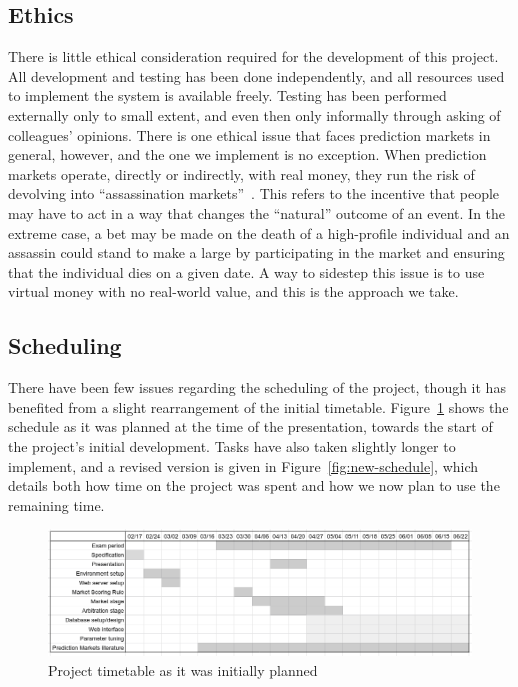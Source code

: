\documentclass[10pt,a4paper]{article}
\theoremstyle{plain}
\theoremstyle{definition}
\begin{document}
\subsection{Ethics}

There is little ethical consideration required for the development of this
project. All development and testing has been done independently, and all
resources used to implement the system is available freely. Testing has been
performed externally only to small extent, and even then only informally
through asking of colleagues' opinions. There is one ethical issue that faces
prediction markets in general, however, and the one we implement is no
exception. When prediction markets operate, directly or indirectly, with real
money, they run the risk of devolving into ``assassination
markets''~\cite{assassinationMarkets, crowdfundingMurder}. This refers to the
incentive that people may have to act in a way that changes the ``natural''
outcome of an event. In the extreme case, a bet may be made on the death of a
high-profile individual and an assassin could stand to make a large by
participating in the market and ensuring that the individual dies on a given
date. A way to sidestep this issue is to use virtual money with no real-world
value, and this is the approach we take.

\subsection{Scheduling}

There have been few issues regarding the scheduling of the project, though it
has benefited from a slight rearrangement of the initial timetable.
Figure~\ref{fig:old-schedule} shows the schedule as it was planned at the time
of the presentation, towards the start of the project's initial development.
Tasks have also taken slightly longer to implement, and a revised version is
given in Figure~\ref{fig:new-schedule}, which details both how time on the
project was spent and how we now plan to use the remaining time.

\begin{figure}[h]
	\centering
	\includegraphics[width=\textwidth]{old-schedule}
	\caption{Project timetable as it was initially planned}
	\label{fig:old-schedule}
\end{figure}
\end{document}
